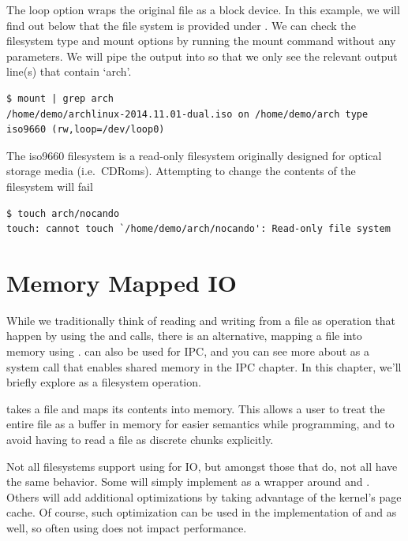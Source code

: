 The loop option wraps the original file as a block device.
In this example, we will find out below that the file system is provided under .
We can check the filesystem type and mount options by running the mount command without any parameters.
We will pipe the output into  so that we only see the relevant output line(s) that contain `arch'.

\begin{verbatim}
$ mount | grep arch
/home/demo/archlinux-2014.11.01-dual.iso on /home/demo/arch type iso9660 (rw,loop=/dev/loop0)
\end{verbatim}

The iso9660 filesystem is a read-only filesystem originally designed for optical storage media (i.e.~CDRoms).
Attempting to change the contents of the filesystem will fail

\begin{verbatim}
$ touch arch/nocando
touch: cannot touch `/home/demo/arch/nocando': Read-only file system
\end{verbatim}

\section{Memory Mapped IO}

While we traditionally think of reading and writing from a file as operation that happen by using the  and  calls, there is an alternative, mapping a file into memory using .
 can also be used for IPC, and you can see more about  as a system call that enables shared memory in the IPC chapter.
In this chapter, we'll briefly explore  as a filesystem operation.

 takes a file and maps its contents into memory.
This allows a user to treat the entire file as a buffer in memory for easier semantics while programming, and to avoid having to read a file as discrete chunks explicitly.

Not all filesystems support using  for IO, but amongst those that do, not all have the same behavior.
Some will simply implement  as a wrapper around  and .
Others will add additional optimizations by taking advantage of the kernel's page cache.
Of course, such optimization can be used in the implementation of  and  as well, so often using  does not impact performance.

